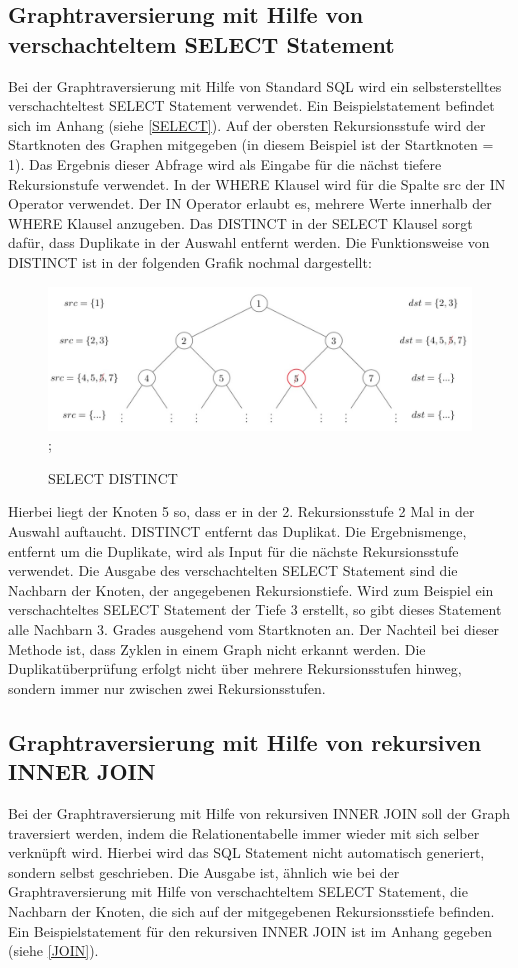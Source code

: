 \subsection{Graphtraversierung mit Hilfe von verschachteltem SELECT Statement}
Bei der Graphtraversierung mit Hilfe von Standard \ac{SQL} wird ein selbsterstelltes verschachteltest SELECT Statement verwendet. Ein Beispielstatement befindet sich im Anhang (siehe \ref{SELECT}).
Auf der obersten Rekursionsstufe wird der Startknoten des Graphen mitgegeben (in diesem Beispiel ist der Startknoten = 1). Das Ergebnis dieser Abfrage wird als Eingabe
für die nächst tiefere Rekursionstufe verwendet. In der WHERE Klausel wird für die Spalte src der IN Operator verwendet. Der IN Operator erlaubt es, mehrere Werte innerhalb
der WHERE Klausel anzugeben. Das DISTINCT in der SELECT Klausel sorgt dafür, dass Duplikate in der Auswahl entfernt werden. Die Funktionsweise von DISTINCT ist in der folgenden
Grafik nochmal dargestellt:
\begin{figure}[H]
    \includegraphics[width = \linewidth]{images/Distinct.jpg};
    \caption{SELECT DISTINCT}
\end{figure}
Hierbei liegt der Knoten 5 so, dass er in der 2. Rekursionsstufe 2 Mal in der Auswahl auftaucht. DISTINCT entfernt das Duplikat. Die Ergebnismenge, entfernt um die
Duplikate, wird als Input für die nächste Rekursionsstufe verwendet.
Die Ausgabe des verschachtelten SELECT Statement sind die Nachbarn der Knoten, der angegebenen Rekursionstiefe. Wird zum Beispiel ein
verschachteltes SELECT Statement der Tiefe 3 erstellt, so gibt dieses Statement alle Nachbarn 3. Grades ausgehend vom Startknoten an. Der Nachteil bei dieser Methode ist, dass
Zyklen in einem Graph nicht erkannt werden. Die Duplikatüberprüfung erfolgt nicht über mehrere Rekursionsstufen hinweg, sondern immer nur zwischen zwei Rekursionsstufen.

\subsection{Graphtraversierung mit Hilfe von rekursiven INNER JOIN}
Bei der Graphtraversierung mit Hilfe von rekursiven INNER JOIN soll der Graph traversiert werden, indem die Relationentabelle immer wieder mit sich selber verknüpft wird. Hierbei
wird das \ac{SQL} Statement nicht automatisch generiert, sondern selbst geschrieben.
Die Ausgabe ist, ähnlich wie bei der Graphtraversierung mit Hilfe von verschachteltem SELECT Statement, die Nachbarn der Knoten, die sich auf der mitgegebenen Rekursionsstiefe
befinden. Ein Beispielstatement für den rekursiven INNER JOIN ist im Anhang gegeben (siehe \ref{JOIN}).

